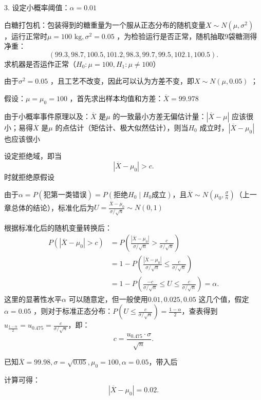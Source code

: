 3. 设定小概率阈值：$\alpha=0.01$ 
\begin{question}
    白糖打包机：包装得到的糖重量为一个服从正态分布的随机变量$X\sim N\left( \mu,\sigma^2  \right)$ ，运行正常时$\mu=100\text{ kg},\sigma^2 =0.05$ ，为检验运行是否正常，随机抽取9袋糖测得净重：\[
        \left( 99.3,98.7,100.5,101.2,98.3,99.7,99.5,102.1,100.5 \right)
    .\]
求机器是否运作正常（$H_0:\mu=100,H_1:\mu\neq 100$）
\end{question}
\begin{sol}
    由于$\sigma^2 =0.05$ ，且工艺不改变，因此可以认为方差不变，即$X\sim N\left( \mu,0.05 \right)$ ；

假设：$\mu=\mu_0=100$ ，首先求出样本均值和方差：$\overline{X}=99.978$

由于小概率事件原理以及：$\overline{X}$ 是$\mu$ 的一致最小方差无偏估计量：$\left| \overline{X}-\mu \right|$ 应该很小；易得$\overline{X}$ 是$\mu$ 的点估计（矩估计、极大似然估计），则当$H_0$ 成立时，$\left| \overline{X}-\mu_0 \right|$ 也应该很小

设定拒绝域，即当\[
    \left| \overline{X}-\mu_0 \right|>c
.\]
时就拒绝原假设

由于$\alpha=P\left( \text{犯第一类错误} \right)=P\left( \text{拒绝}H_0\mid H_0\text{成立} \right)$，且$\overline{X}\sim N\left( \mu_0,\frac{\sigma}{n} \right)$（上一章总体的结论），标准化后为$U=\frac{\overline{X}-\mu_0}{\sigma /\sqrt{n}}\sim N\left( 0,1 \right)$

根据标准化后的随机变量转换后：
\begin{align*}
    P\left( \left| \overline{X}-\mu_0 \right| >c\right)&= P\left( \frac{\left| \overline{X}-\mu_0 \right|}{\sigma /\sqrt{n}}>\frac{c}{\sigma /\sqrt{n}} \right) \\
    &= 1-P\left( \frac{\left| \overline{X} -\mu_0\right|}{\sigma /\sqrt{n}}\le \frac{c}{\sigma /\sqrt{n}} \right) \\
    &= 1-P\left( \frac{-c}{\sigma /\sqrt{n}}\le U \le \frac{c}{\sigma /\sqrt{n}} \right) =\alpha
.\end{align*}
这里的显著性水平$\alpha$ 可以随意定，但一般使用$0.01,0.025,0.05$ 这几个值，假定$\alpha=0.05$ ，则对于标准正态分布：$P\left( U\le \frac{c}{\sigma /\sqrt{n}} \right)=\frac{1-\alpha}{2}$，查表得到$u_{\frac{1-\alpha}{2}}=u_{0.475}=\frac{c}{\sigma /\sqrt{n}}$，即：\[
    c=\frac{u_{0.475}\cdot \sigma}{\sqrt{n}}
.\]

已知$\overline{X}=99.98,\sigma=\sqrt{0.05},\mu_0=100,\alpha=0.05$，带入后

计算可得：\[
    \left| \overline{X}-\mu_0 \right|=0.02
.\]
\end{sol}
